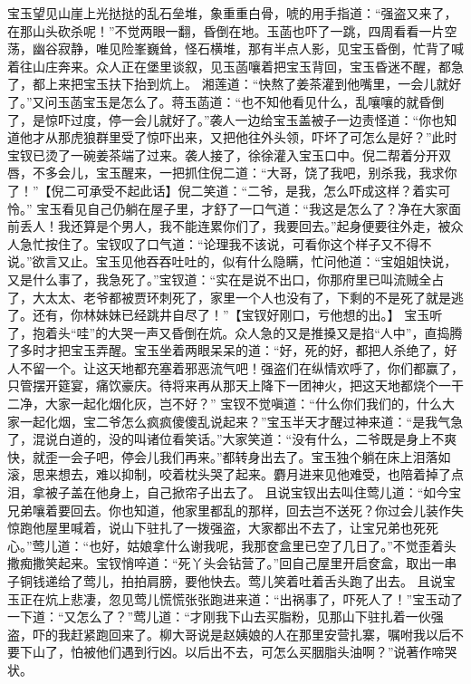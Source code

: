 \documentclass[12pt,oneside]{book}
\begin{document}
宝玉望见山崖上光挞挞的乱石垒堆，象重重白骨，唬的用手指道：“强盗又来了，在那山头砍杀呢！”不觉两眼一翻，昏倒在地。玉菡也吓了一跳，四周看看一片空荡，幽谷寂静，唯见险峯巍耸，怪石横堆，那有半点人影，见宝玉昏倒，忙背了喊着往山庄奔来。众人正在堡里谈叙，见玉菡嚷着把宝玉背回，宝玉昏迷不醒，都急了，都上来把宝玉扶下抬到炕上。
湘莲道：“快熬了姜茶灌到他嘴里，一会儿就好了。”又问玉菡宝玉是怎么了。蒋玉菡道：“也不知他看见什么，乱嚷嚷的就昏倒了，是惊吓过度，停一会儿就好了。”袭人一边给宝玉盖被子一边责怪道：“你也知道他才从那虎狼群里受了惊吓出来，又把他往外头领，吓坏了可怎么是好？”此时宝钗已烫了一碗姜茶端了过来。袭人接了，徐徐灌入宝玉口中。倪二帮着分开双唇，不多会儿，宝玉醒来，一把抓住倪二道：“大哥，饶了我吧，别杀我，我求你了！”【倪二可承受不起此话】倪二笑道：“二爷，是我，怎么吓成这样？着实可怜。”
宝玉看见自己仍躺在屋子里，才舒了一口气道：“我这是怎么了？净在大家面前丢人！我还算是个男人，我不能连累你们了，我要回去。”起身便要往外走，被众人急忙按住了。宝钗叹了口气道：“论理我不该说，可看你这个样子又不得不说。”欲言又止。宝玉见他吞吞吐吐的，似有什么隐瞒，忙问他道：“宝姐姐快说，又是什么事了，我急死了。”宝钗道：“实在是说不出口，你那府里已叫流贼全占了，大太太、老爷都被贾环刺死了，家里一个人也没有了，下剩的不是死了就是逃了。还有，你林妹妹已经跳井自尽了！”【宝钗好刚口，亏他想的出。】
宝玉听了，抱着头“哇”的大哭一声又昏倒在炕。众人急的又是推搡又是掐“人中”，直捣腾了多时才把宝玉弄醒。宝玉坐着两眼呆呆的道：“好，死的好，都把人杀绝了，好人不留一个。让这天地都充塞着邪恶流气吧！强盗们在纵情欢呼了，你们都赢了，只管摆开筵宴，痛饮豪庆。待将来再从那天上降下一团神火，把这天地都烧个一干二净，大家一起化烟化灰，岂不好？”
宝钗不觉嗔道：“什么你们我们的，什么大家一起化烟，宝二爷怎么疯疯傻傻乱说起来？”宝玉半天才醒过神来道：“是我气急了，混说白道的，没的叫诸位看笑话。”大家笑道：“没有什么，二爷既是身上不爽快，就歪一会子吧，停会儿我们再来。”都转身出去了。宝玉独个躺在床上泪落如滚，思来想去，难以抑制，咬着枕头哭了起来。麝月进来见他难受，也陪着掉了点泪，拿被子盖在他身上，自己掀帘子出去了。
且说宝钗出去叫住莺儿道：“如今宝兄弟嚷着要回去。你也知道，他家里都乱的那样，回去岂不送死？你过会儿装作失惊跑他屋里喊着，说山下驻扎了一拨强盗，大家都出不去了，让宝兄弟也死死心。”莺儿道：“也好，姑娘拿什么谢我呢，我那奁盒里已空了几日了。”不觉歪着头撒痴撒笑起来。宝钗悄啐道：“死丫头会钻营了。”回自己屋里开启奁盒，取出一串子铜钱递给了莺儿，拍拍肩膀，要他快去。莺儿笑着吐着舌头跑了出去。
且说宝玉正在炕上悲凄，忽见莺儿慌慌张张跑进来道：“出祸事了，吓死人了！”宝玉动了一下道：“又怎么了？”莺儿道：“才刚我下山去买脂粉，见那山下驻扎着一伙强盗，吓的我赶紧跑回来了。柳大哥说是赵姨娘的人在那里安营扎寨，嘱咐我以后不要下山了，怕被他们遇到行凶。以后出不去，可怎么买胭脂头油啊？”说著作啼哭状。
\end{document}
